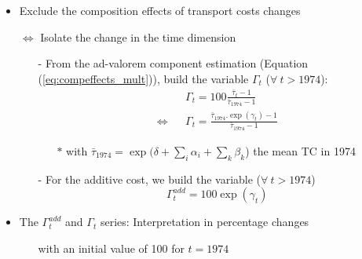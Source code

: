 \documentclass[10 pt,Helvetica, french]{beamer}
\begin{document}
\begin{frame}
\begin{itemize}
\item Exclude the composition effects of transport costs changes  \vspace{0.1cm}
\item[$\Leftrightarrow$] Isolate the change in the time dimension  \vspace{0.1cm}
\begin{itemize}
\item[-] From the ad-valorem component estimation (Equation (\ref{eq:compeffects_mult})), build the variable $\Gamma_t$ ($\forall~t > 1974$):
\begin{eqnarray*}
&&\Gamma_t = 100\frac {\bar{\tau}_{t}-1} {\bar{\tau}_{1974}-1} \\
\Leftrightarrow && \Gamma_t= \frac {\bar{\tau}_{1974}.\exp(\gamma_t)-1} {\bar{\tau}_{1974}-1}
\end{eqnarray*}
\begin{itemize}
\item[$\ast$] with $\bar{\tau}_{1974} = \exp(\delta+\sum_i \alpha_i + \sum_k \beta_k$) the mean TC in 1974
\end{itemize}
\item[-] For the additive cost, we build the variable ($\forall~t > 1974$)
$$\Gamma^{add}_t = 100 \exp(\gamma_t)$$
\end{itemize}
\item The $\Gamma^{add}_t$ and $\Gamma_t$ series: Interpretation in percentage changes
\begin{itemize}
\item[] with an initial value of 100 for $t=1974$
\end{itemize}
\end{itemize}

\end{frame}
\end{document}
